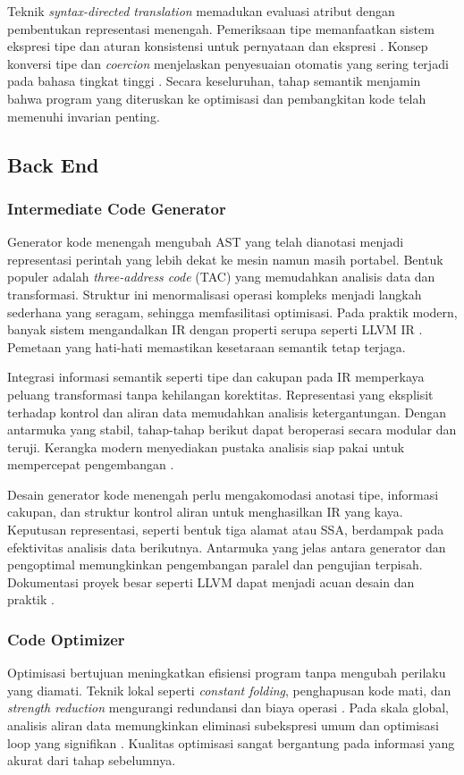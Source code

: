 \documentclass[../main.tex]{subfiles}
\begin{document}
Teknik \emph{syntax-directed translation} memadukan evaluasi atribut dengan pembentukan representasi menengah. Pemeriksaan tipe memanfaatkan sistem ekspresi tipe dan aturan konsistensi untuk pernyataan dan ekspresi \citep{WikiTypeSystem,WikiTypeChecking}. Konsep konversi tipe dan \emph{coercion} menjelaskan penyesuaian otomatis yang sering terjadi pada bahasa tingkat tinggi \citep{WikiCoercion}. Secara keseluruhan, tahap semantik menjamin bahwa program yang diteruskan ke optimisasi dan pembangkitan kode telah memenuhi invarian penting.

\subsection{Back End}
\subsubsection{Intermediate Code Generator}
Generator kode menengah mengubah AST yang telah dianotasi menjadi representasi perintah yang lebih dekat ke mesin namun masih portabel. Bentuk populer adalah \emph{three-address code} (TAC) yang memudahkan analisis data dan transformasi. Struktur ini menormalisasi operasi kompleks menjadi langkah sederhana yang seragam, sehingga memfasilitasi optimisasi. Pada praktik modern, banyak sistem mengandalkan IR dengan properti serupa seperti LLVM IR \citep{LLVMOverview,WikiTAC}. Pemetaan yang hati-hati memastikan kesetaraan semantik tetap terjaga.

Integrasi informasi semantik seperti tipe dan cakupan pada IR memperkaya peluang transformasi tanpa kehilangan korektitas. Representasi yang eksplisit terhadap kontrol dan aliran data memudahkan analisis ketergantungan. Dengan antarmuka yang stabil, tahap-tahap berikut dapat beroperasi secara modular dan teruji. Kerangka modern menyediakan pustaka analisis siap pakai untuk mempercepat pengembangan \citep{LLVMOverview}.

Desain generator kode menengah perlu mengakomodasi anotasi tipe, informasi cakupan, dan struktur kontrol aliran untuk menghasilkan IR yang kaya. Keputusan representasi, seperti bentuk tiga alamat atau SSA, berdampak pada efektivitas analisis data berikutnya. Antarmuka yang jelas antara generator dan pengoptimal memungkinkan pengembangan paralel dan pengujian terpisah. Dokumentasi proyek besar seperti LLVM dapat menjadi acuan desain dan praktik \citep{LLVMOverview}.

\subsubsection{Code Optimizer}
Optimisasi bertujuan meningkatkan efisiensi program tanpa mengubah perilaku yang diamati. Teknik lokal seperti \emph{constant folding}, penghapusan kode mati, dan \emph{strength reduction} mengurangi redundansi dan biaya operasi \citep{WikiConstantFolding,WikiDCE,WikiStrengthReduction}. Pada skala global, analisis aliran data memungkinkan eliminasi subekspresi umum dan optimisasi loop yang signifikan \citep{WikiCSE,WikiLoopOptimization}. Kualitas optimisasi sangat bergantung pada informasi yang akurat dari tahap sebelumnya.
\end{document}
